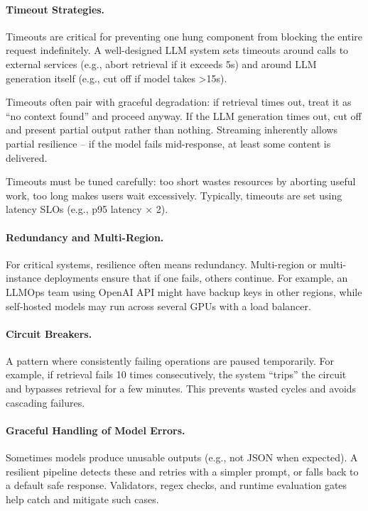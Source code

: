 \paragraph*{Timeout Strategies.}
Timeouts are critical for preventing one hung component from blocking the entire request indefinitely. A well-designed LLM system sets timeouts around calls to external services (e.g., abort retrieval if it exceeds 5s) and around LLM generation itself (e.g., cut off if model takes >15s).  

Timeouts often pair with graceful degradation: if retrieval times out, treat it as “no context found” and proceed anyway. If the LLM generation times out, cut off and present partial output rather than nothing. Streaming inherently allows partial resilience – if the model fails mid-response, at least some content is delivered.  

Timeouts must be tuned carefully: too short wastes resources by aborting useful work, too long makes users wait excessively. Typically, timeouts are set using latency SLOs (e.g., p95 latency × 2).

\paragraph*{Redundancy and Multi-Region.}
For critical systems, resilience often means redundancy. Multi-region or multi-instance deployments ensure that if one fails, others continue. For example, an LLMOps team using OpenAI API might have backup keys in other regions, while self-hosted models may run across several GPUs with a load balancer.

\paragraph*{Circuit Breakers.}
A pattern where consistently failing operations are paused temporarily. For example, if retrieval fails 10 times consecutively, the system “trips” the circuit and bypasses retrieval for a few minutes. This prevents wasted cycles and avoids cascading failures.

\paragraph*{Graceful Handling of Model Errors.}
Sometimes models produce unusable outputs (e.g., not JSON when expected). A resilient pipeline detects these and retries with a simpler prompt, or falls back to a default safe response. Validators, regex checks, and runtime evaluation gates help catch and mitigate such cases.

